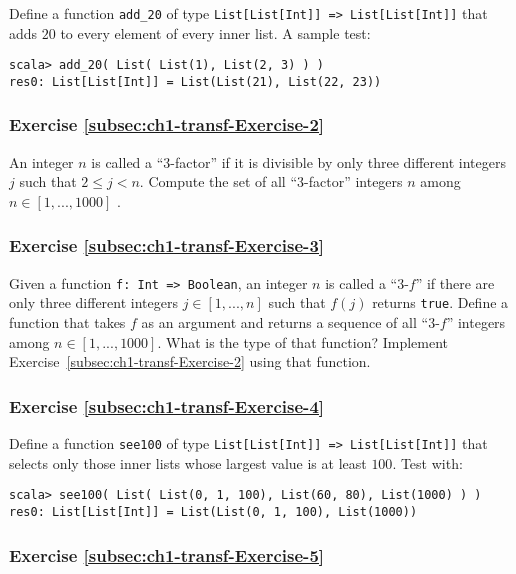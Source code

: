 Define a function \texttt{}\lstinline!add_20! of type \texttt{}\lstinline!List[List[Int]] => List[List[Int]]!
that adds $20$ to every element of every inner list. A sample test:
\begin{lstlisting}
scala> add_20( List( List(1), List(2, 3) ) )
res0: List[List[Int]] = List(List(21), List(22, 23))
\end{lstlisting}


\subsubsection{Exercise \label{subsec:ch1-transf-Exercise-2}\ref{subsec:ch1-transf-Exercise-2}}

An integer $n$ is called a ``$3$-factor'' if it is divisible by
only three different integers $j$ such that $2\leq j<n$. Compute
the set of all ``$3$-factor'' integers $n$ among $n\in[1,...,1000]$
.

\subsubsection{Exercise \label{subsec:ch1-transf-Exercise-3}\ref{subsec:ch1-transf-Exercise-3}}

Given a function \lstinline!f: Int => Boolean!, an integer $n$ is
called a ``$3$-$f$'' if there are only three different integers
$j\in[1,...,n]$ such that $f(j)$ returns \lstinline!true!. Define
a function that takes $f$ as an argument and returns a sequence of
all ``$3$-$f$'' integers among $n\in[1,...,1000]$. What is the
type of that function? Implement Exercise~\ref{subsec:ch1-transf-Exercise-2}
using that function.

\subsubsection{Exercise \label{subsec:ch1-transf-Exercise-4}\ref{subsec:ch1-transf-Exercise-4}}

Define a function \lstinline!see100! of type \texttt{}\lstinline!List[List[Int]] => List[List[Int]]!
that selects only those inner lists whose largest value is at least
$100$. Test with:
\begin{lstlisting}
scala> see100( List( List(0, 1, 100), List(60, 80), List(1000) ) )
res0: List[List[Int]] = List(List(0, 1, 100), List(1000))
\end{lstlisting}


\subsubsection{Exercise \label{subsec:ch1-transf-Exercise-5}\ref{subsec:ch1-transf-Exercise-5}}

